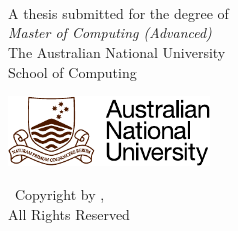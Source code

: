 \begin{titlepage}
  \begin{center}
    \vspace*{0cm}
    { \fontsize{20}{10} \selectfont \thesistitle} \\
    \vspace{0.3cm}
    { \fontsize{20}{10} \selectfont \thesistitletwo} \\
            \vspace{0.3cm}
    { \fontsize{20}{10} \selectfont \thesistitlethree}

    \vspace{2.0cm}
    {\bf \huge \fullname}\\
    \vspace{2cm}
    {\large A thesis submitted for the degree of}\\
    \vspace{0.5cm}
    {\it \large Master of Computing (Advanced)}\\
    \vspace{0.5cm}
    {\large The Australian National University}\\
    \vspace{0.5cm}
    { \large School of Computing} \par
    \vspace{2.0cm}
    \includegraphics[width=0.4\textwidth]{anu-logo-colour.pdf}\\
    \vspace{2.0cm}
    {\large \thesisdate}

    \vspace{1.75cm}
    {\large  \textcopyright\ Copyright by \fullname,  \thesisyear \\}
    \vspace{0.5cm}
    {\large All Rights Reserved}
  \end{center}
\end{titlepage}
